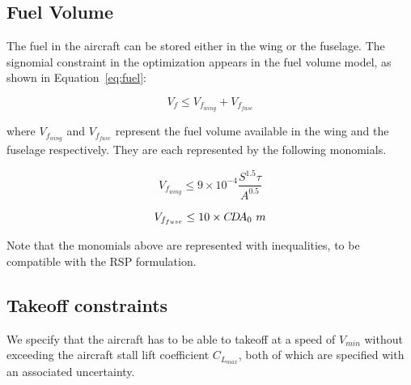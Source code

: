 \subsection{Fuel Volume}
The fuel in the aircraft can be stored either in the wing or the fuselage.
The signomial constraint in the optimization appears in the fuel volume model, as shown in Equation~\ref{eq:fuel}:

\begin{equation}
\label{eq:fuel}
V_f \leq V_{f_{wing}} + V_{f_{fuse}} 
\end{equation}

where $V_{f_{wing}}$ and $V_{f_{fuse}}$ represent the fuel volume available in the wing
and the fuselage respectively. They are each represented by the following monomials.

\begin{equation}
\label{eq:fuelwing}
V_{f_{wing}} \leq 9 \times 10^{-4} \frac{S^{1.5}\tau}{A^{0.5}}
\end{equation}

\begin{equation}
\label{eq:fuelfuse}
V_{f_{fuse}} \leq 10 \times C\!D\!A_0~m
\end{equation}

Note that the monomials above are represented with inequalities, to be compatible with the RSP formulation. 

\subsection{Takeoff constraints}
We specify that the aircraft has to be able to takeoff at a speed of $V_{min}$
without exceeding the aircraft stall lift coefficient $C_{L_{max}}$, both of which are
specified with an associated uncertainty.

